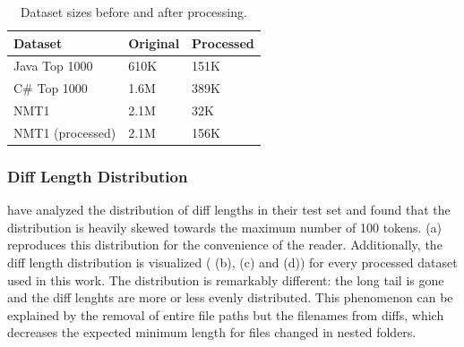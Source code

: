 \begin{table}[]
\caption{Dataset sizes before and after processing.}
\label{tbl:dataset_processing}
\begin{tabular}{@{}lll@{}}
\toprule
\textbf{Dataset} & \textbf{Original} & \textbf{Processed} \\ \midrule
         Java Top 1000    & 610K & 151K \\
         C\# Top 1000     & 1.6M & 389K \\
         NMT1 \cite{jiang_automatically_2017} & 2.1M & 32K \\
         NMT1 (processed) & 2.1M & 156K \\
         \bottomrule
\end{tabular}
\end{table}

\subsubsection{Diff Length Distribution}\label{subsec:difflength}
\citet[fig.5]{jiang_automatically_2017} have analyzed the distribution of diff lengths in their test set and found that the distribution is heavily skewed towards the maximum number of 100 tokens.  (a) reproduces this distribution for the convenience of the reader. Additionally, the diff length distribution is visualized ( (b), (c) and (d)) for every processed dataset used in this work. The distribution is remarkably different: the long tail is gone and the diff lenghts are more or less evenly distributed. This phenomenon can be explained by the removal of entire file paths but the filenames from diffs, which decreases the expected minimum length for files changed in nested folders.
